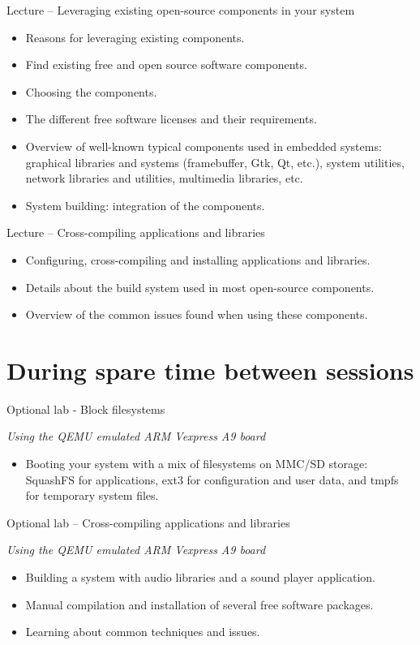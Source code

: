 \documentclass[a4paper,12pt,obeyspaces,spaces,hyphens]{article}
\begin{document}
\feagendatwocolumn
{Lecture – Leveraging existing open-source components in your system}
{
  \begin{itemize}
  \item Reasons for leveraging existing components.
  \item Find existing free and open source software components.
  \item Choosing the components.
  \item The different free software licenses and their requirements.
  \item Overview of well-known typical components used in
        embedded systems: graphical libraries and systems
        (framebuffer, Gtk, Qt, etc.), system utilities,
        network libraries and utilities, multimedia libraries, etc.
  \item System building: integration of the components.
  \end{itemize}
}
{Lecture – Cross-compiling applications and libraries}
{
  \begin{itemize}
  \item Configuring, cross-compiling and installing applications and libraries.
  \item Details about the build system used in most open-source components.
  \item Overview of the common issues found when using these components.
  \end{itemize}
}

\section{During spare time between sessions}

\feagendaonecolumn
{Optional lab - Block filesystems}
{
  {\em Using the QEMU emulated ARM Vexpress A9 board}
  \begin{itemize}
  \item Booting your system with a mix of filesystems on MMC/SD storage: SquashFS for
	applications, ext3 for configuration and user data, and
	tmpfs for temporary system files.
  \end{itemize}
}

\feagendaonecolumn
{Optional lab – Cross-compiling applications and libraries}
{
  {\em Using the QEMU emulated ARM Vexpress A9 board}
  \begin{itemize}
  \item Building a system with audio libraries and a sound player application.
  \item Manual compilation and installation of several free software packages.
  \item Learning about common techniques and issues.
  \end{itemize}
}
\end{document}
